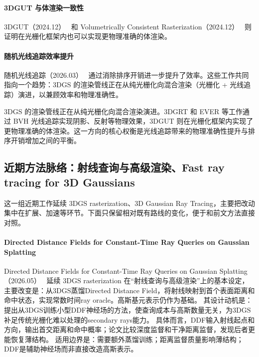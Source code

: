 \paragraph{3DGUT 与体渲染一致性}
3DGUT（2024.12）~\cite{2412_12507} 和 Volumetrically Consistent Rasterization（2024.12）~\cite{2412_03378} 则证明在光栅化框架内也可以实现更物理准确的体渲染。

\paragraph{随机光线追踪效率提升}
随机光线追踪（2026.03）~\cite{2603_23637} 通过消除排序开销进一步提升了效率。这些工作共同指向一个趋势：3DGS 的渲染管线正在从纯光栅化向混合渲染（光栅化 + 光线追踪）演进，以兼顾效率和物理准确性。

\begin{takeaway}
3DGS 的渲染管线正在从纯光栅化向混合渲染演进。3DGRT 和 EVER 等工作通过 BVH 光线追踪实现阴影、反射等物理效果，3DGUT 则在光栅化框架内实现了更物理准确的体渲染。这一方向的核心权衡是光线追踪带来的物理准确性提升与排序开销增加之间的平衡。
\end{takeaway}


\subsection{近期方法脉络：射线查询与高级渲染、Fast ray tracing for 3D Gaussians}

这一组近期工作延续 3DGS rasterization、3D Gaussian Ray Tracing，主要把改动集中在扩展、加速等环节。下面只保留相对既有路线的变化，便于和前文方法直接对照。

\paragraph{Directed Distance Fields for Constant-Time Ray Queries on Gaussian Splatting}
Directed Distance Fields for Constant-Time Ray Queries on Gaussian Splatting（2026.05）~\cite{2606_00817} 延续 3DGS rasterization 在“射线查询与高级渲染”上的基本设定，主要改变是：从3DGS蒸馏Directed Distance Field，将射线映射到首个表面距离和命中状态，实现常数时间ray oracle。高斯基元表示仍作为基础。
其设计动机是：提出从3DGS训练小型DDF神经场的方法，使查询成本与高斯数量无关，为3DGS补足传统光栅化难以处理的secondary rays能力。
具体而言，DDF输入射线起点和方向，输出首交距离和命中概率；论文比较深度监督和干净距离监督，发现后者更能恢复薄结构。
适用边界是：需要额外蒸馏训练；距离监督质量影响薄结构；DDF是辅助神经场而非直接改造高斯表示。

